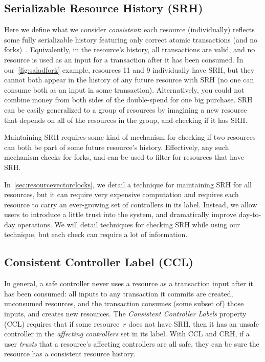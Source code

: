 \documentclass[a4paper,USenglish,cleveref, autoref, thm-restate, anonymous]{lipics-v2021}
\begin{document}
\subsection{Serializable Resource History (SRH)}
Here we define what we consider \emph{consistent}: each resource (individually) reflects some fully serializable history featuring only correct atomic transactions (and no forks)~\cite{serializability}. 
Equivalently, in the resource's history, all transactions are valid, and no resource is used as an input for a transaction after it has been consumed. 
In our~\cref{fig:saladfork} example, resources 11 and 9 individually have SRH, but they cannot both appear in the history of any future resource with SRH (no one can consume both as an input in some transaction).
Alternatively, you could not combine money from both sides of the double-spend for one big purchase.
SRH can be easily generalized to a group of resources by imagining a new resource that depends on all of the resources in the group, and checking if it has SRH.

Maintaining SRH requires some kind of mechanism for checking if two resources can both be part of some future resource's history. 
Effectively, any such mechanism checks for forks, and can be used to filter for resources that have SRH.


In~\cref{sec:resourcevectorclocks}, we detail a technique for maintaining SRH for all resources, but it can require very expensive computation and requires each resource to carry an ever-growing set of controllers in its label. 
Instead, we allow users to introduce a little trust into the system, and dramatically improve day-to-day operations.
We will detail techniques for checking SRH while using our technique, but each check can require a lot of information.

\subsection{Consistent Controller Label (CCL)}
In general, a safe controller never uses a resource as a transaction input after it has been consumed: all inputs to any transaction it commits are created, unconsumed resources, and the transaction consumes (some subset of) those inputs, and creates new resources. 
The \emph{Consistent Controller Labels}  property (CCL) requires that if some resource~$r$ does not have SRH, then it has an unsafe controller in the \textit{affecting controllers} set in its label.
With CCL and CRH, if a user \textit{trusts} that a resource's affecting controllers are all safe, they can be sure the resource has a consistent resource history. 
\end{document}
